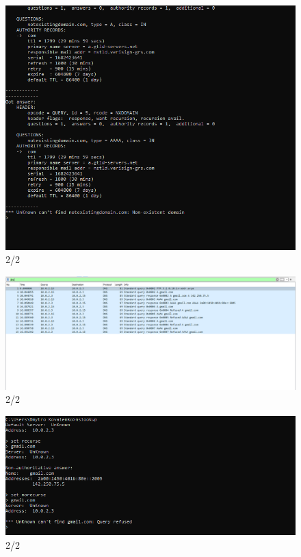 \documentclass{article}
\begin{document}
\begin{normalsize}
\begin{figure}[H]
	\includegraphics{53}
	\caption{2/2}
\end{figure}
\begin{figure}[H]
	\centering
	\includegraphics{61}
	\caption{2/2}
\end{figure}
\begin{figure}[H]
	\centering
	\includegraphics{62}
	\caption{2/2}
\end{figure}
\begin{figure}[H]
	\centering

\end{figure}
\end{normalsize}
\end{document}
